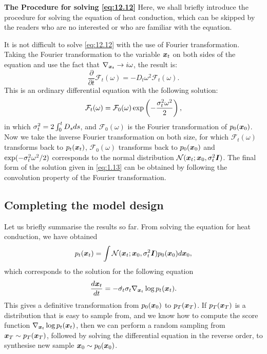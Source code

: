 \begin{myquote}
\textbf{The Procedure for solving \cref{eq:12.12}} Here, we shall briefly introduce the procedure for solving the equation of heat conduction, which can be skipped by the readers who are no interested or who are familiar with the equation. 

It is not difficult to solve \cref{eq:12.12} with the use of Fourier transformation. Taking the Fourier transformation to the variable $\bm{x}_{t}$ on both sides of the equation and use the fact that $\nabla_{\bm{x}_{t}}\to i\omega$, the result is:
\begin{equation}
    \label{eq:12.14}
    \frac{\partial}{\partial t}\mathcal{F}_t(\omega)=-D_t\omega^2\mathcal{F}_t(\omega).
\end{equation}
This is an ordinary differential equation with the following solution:
\begin{equation}
    \label{eq:12.15}
    \mathcal{F}_t(\omega)=\mathcal{F}_0(\omega)\exp\left(-\frac{\sigma_t^2\omega^2}{2} \right),
\end{equation}
in which $\sigma_t^2=2\int_0^t D_s ds$, and $\mathcal{F}_{0}(\omega)$ is the Fourier transformation of $p_0(\bm{x}_0)$. Now we take the inverse Fourier transformation on both size, for which $\mathcal{F}_t(\omega)$ transforms back to $p_t(\bm{x}_{t})$, $\mathcal{F}_0 (\omega)$ transforms back to $p_0(\bm{x}_0)$ and $\exp(-\sigma_t^2\omega^2/2)$ corresponds to the normal distribution $\mathcal{N}(\bm{x}_{t};\bm{x}_0,\sigma_t^2\bm{I})$. The final form of the solution given in \cref{eq:1.13} can be obtained by following the convolution property of the Fourier transformation.
\end{myquote}

\subsection{Completing the model design}

Let us briefly summarise the results so far. From solving the equation for heat conduction, we have obtained
\begin{equation}
    \label{eq:12.16}
    p_t(\bm{x}_{t})=\int \mathcal{N}(\bm{x}_{t};\bm{x}_0,\sigma_t^2\bm{I})p_0(\bm{x}_0)d\bm{x}_0,
\end{equation}
which corresponds to the solution for the following equation
\begin{equation}
    \label{eq:12.17}
    \frac{d\bm{x}_{t}}{dt}=-\dot{\sigma_t}\sigma_t \nabla_{\bm{x}_{t}}\log p_{t}(\bm{x}_{t}).
\end{equation}
This gives a definitive transformation from $p_0(\bm{x}_0)$ to $p_T (\bm{x}_T)$. If $p_T (\bm{x}_T)$ is a distribution that is easy to sample from, and we know how to compute the score function $\nabla_{\bm{x}_{t}}\log p_{t}(\bm{x}_{t})$, then we can perform a random sampling from $\bm{x}_T\sim p_T (\bm{x}_T)$, followed by solving the differential equation in the reverse order, to synthesise new sample $\bm{x}_0\sim p_0(\bm{x}_0)$.

